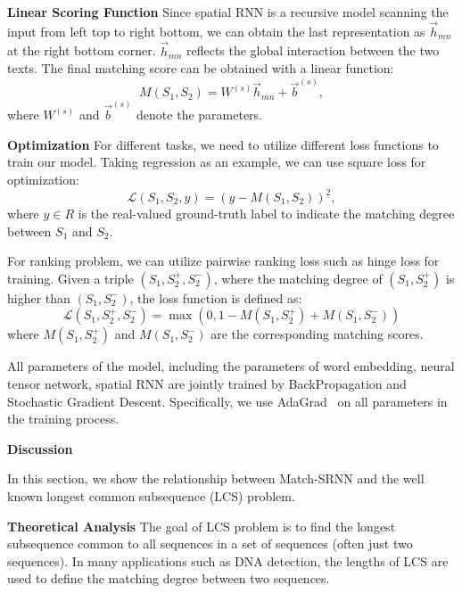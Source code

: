 \textbf{Linear Scoring Function}
Since spatial RNN is a recursive model scanning the input from left top to right bottom, we can obtain the last representation as $\vec{h}_{mn}$ at the right bottom corner. $\vec{h}_{mn}$ reflects the global interaction between the two texts. The final matching score can be obtained with a linear function:
\begin{equation}
M(S_1,S_2)=W^{(s)}\vec{h}_{mn}+\vec{b}^{(s)},
\end{equation}
where $W^{(s)}$ and $\vec{b}^{(s)}$ denote the parameters.

\textbf{Optimization}
For different tasks, we need to utilize different loss functions to train our model.
Taking regression as an example, we can use square loss for optimization:
\begin{equation}
\mathcal{L}(S_1,S_2,y)= (y-M(S_1,S_2))^2,
\end{equation}
where $y\in R$ is the real-valued ground-truth label to indicate the matching degree between $S_1$ and $S_2$.

For ranking problem, we can utilize pairwise ranking loss such as hinge loss for training. Given a triple $(S_1,S_2^+,S_2^-)$, where the matching degree of $(S_1,S_2^+)$ is higher than $(S_1,S_2^-)$, the loss function is defined as:
\begin{equation*}
\mathcal{L}(S_1, S_2^+, S_2^-) = \max(0, 1-M(S_1, S_2^+)+M(S_1, S_2^-))
\end{equation*}
where $M(S_1,S_2^+)$ and $M(S_1,S_2^-)$ are the corresponding matching scores.

All parameters of the model, including the parameters of word embedding, neural tensor network, spatial RNN are jointly trained by BackPropagation and Stochastic Gradient Descent. Specifically, we use AdaGrad~\cite{duchi2011adaptive} on all parameters in the training process.

\textbf{Discussion}

In this section, we show the relationship between Match-SRNN and the well known longest common subsequence (LCS) problem.

\textbf{Theoretical Analysis}
The goal of LCS problem is to find the longest subsequence common to all sequences in a set of sequences (often just two sequences). In many applications such as DNA detection, the lengths of LCS are used to define the matching degree between two sequences. %

